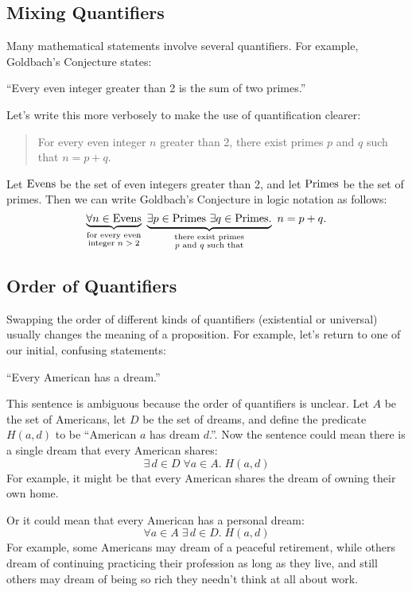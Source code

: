\subsection{Mixing Quantifiers}

Many mathematical statements involve several quantifiers.  For
example, Goldbach's Conjecture states:
%
\begin{center}
``Every even integer greater than 2 is the sum of two primes.''
\end{center}
%
Let's write this more verbosely to make the use of quantification
clearer:
%
\begin{quote}
For every even integer $n$ greater than 2,
there exist primes $p$ and $q$ such that $n = p + q$.
\end{quote}
%
Let $\text{Evens}$ be the set of even integers greater than 2, and let $\text{Primes}$ be the
set of primes.  Then we can write Goldbach's Conjecture in logic
notation as follows:
%
\[
\underbrace{\forall n \in \text{Evens}}_{\substack
    {\text{for every even} \\
     \text{integer $n > 2$}}}
\
\underbrace{\exists p \in \text{Primes}\ \exists q \in \text{Primes}.}_{\substack
    {\text{there exist primes} \\
     \text{$p$ and $q$ such that}}}
\ n = p + q.
\]

\subsection{Order of Quantifiers}

Swapping the order of different kinds of quantifiers (existential or
universal) usually changes the meaning of a proposition.  For example,
let's return to one of our initial, confusing statements:
\begin{center}
``Every American has a dream.''
\end{center}

This sentence is ambiguous because the order of quantifiers is
unclear.  Let $A$ be the set of Americans, let $D$ be the set of
dreams, and define the predicate $H(a, d)$ to be ``American $a$ has
dream $d$.''.  Now the sentence could mean there is a single dream
that every American shares:
\[
\exists\, d \in D\; \forall a \in A.\; H(a, d)
\]
For example, it might be that every American shares the dream of owning
their own home.

Or it could mean that every American has a personal dream:
\[
\forall a \in A\; \exists\, d \in D.\; H(a, d)
\]
For example, some Americans may dream of a peaceful retirement, while
others dream of continuing practicing their profession as long as they
live, and still others may dream of being so rich they needn't think at
all about work.

